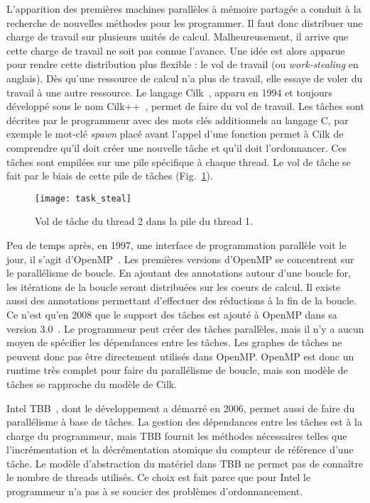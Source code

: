 L'apparition des premières machines parallèles à mémoire partagée a conduit à la recherche de nouvelles méthodes pour les programmer.
%
Il faut donc distribuer une charge de travail sur plusieurs unités de calcul.
%
Malheureusement, il arrive que cette charge de travail ne soit pas connue l'avance.
%
Une idée est alors apparue pour rendre cette distribution plus flexible : le vol de travail (ou {\em work-stealing} en anglais).
%
Dès qu'une ressource de calcul n'a plus de travail, elle essaye de voler du travail à une autre ressource.
%
Le langage Cilk~\cite{Cilk}, apparu en 1994 et toujours développé sous le nom Cilk++~\cite{Cilk++}, permet de faire du vol de travail.
%
Les tâches sont décrites par le programmeur avec des mots clés additionnels au langage C, par exemple le mot-clé {\em spawn} placé avant l'appel d'une fonction permet à Cilk de comprendre qu'il doit créer une nouvelle tâche et qu'il doit l'ordonnancer.
%
Ces tâches sont empilées sur une pile spécifique à chaque thread.
%
Le vol de tâche se fait par le biais de cette pile de tâches (Fig.~\ref{fig:task_steal}).
\begin{figure}[t!]
  \centering
  \texttt{[image: task\_steal]}
  \caption{Vol de tâche du thread 2 dans la pile du thread 1.}
  \label{fig:task_steal}
\end{figure}


Peu de temps après, en 1997, une interface de programmation parallèle voit le jour, il s'agit d'OpenMP~\cite{OpenMP}.
%
Les premières versions d'OpenMP se concentrent sur le parallélisme de boucle.
%
En ajoutant des annotations autour d'une boucle for, les itérations de la boucle seront distribuées sur les coeurs de calcul.
%
Il existe aussi des annotations permettant d'effectuer des réductions à la fin de la boucle.
%
Ce n'est qu'en 2008 que le support des tâches est ajouté à OpenMP dans sa version 3.0~\cite{openmptasks}.
%
Le programmeur peut créer des tâches parallèles, mais il n'y a aucun moyen de spécifier les dépendances entre les tâches.
%
Les graphes de tâches ne peuvent donc pas être directement utilisés dans OpenMP.
%
OpenMP est donc un runtime très complet pour faire du parallélisme de boucle, mais son modèle de tâches se rapproche du modèle de Cilk.

Intel TBB~\cite{Intel_TBB}, dont le développement a démarré en 2006, permet aussi de faire du parallélisme à base de tâches.
%
La gestion des dépendances entre les tâches est à la charge du programmeur, mais TBB fournit les méthodes nécessaires telles que l'incrémentation et la décrémentation atomique du compteur de référence d'une tâche.
%
Le modèle d'abstraction du matériel dans TBB ne permet pas de connaître le nombre de threads utilisés.
%
Ce choix est fait parce que pour Intel le programmeur n'a pas à se soucier des problèmes d'ordonnancement.



